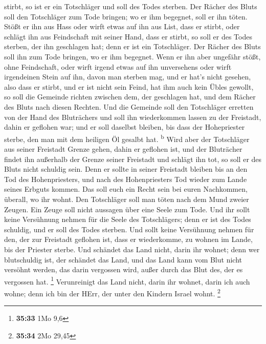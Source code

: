 stirbt, so ist er ein Totschläger und soll des Todes sterben.
 Der Rächer des Bluts soll den Totschläger zum Tode
bringen; wo er ihm begegnet, soll er ihn töten.  Stößt er
ihn aus Hass oder wirft etwas auf ihn aus List, dass er stirbt,
 oder schlägt ihn aus Feindschaft mit seiner Hand, dass
er stirbt, so soll er des Todes sterben, der ihn geschlagen hat; denn er
ist ein Totschläger. Der Rächer des Bluts soll ihn zum Tode bringen, wo
er ihm begegnet.  Wenn er ihn aber ungefähr stößt, ohne
Feindschaft, oder wirft irgend etwas auf ihn unversehens 
oder wirft irgendeinen Stein auf ihn, davon man sterben mag, und er
hat's nicht gesehen, also dass er stirbt, und er ist nicht sein Feind,
hat ihm auch kein Übles gewollt,  so soll die Gemeinde
richten zwischen dem, der geschlagen hat, und dem Rächer des Bluts nach
diesen Rechten.  Und die Gemeinde soll den Totschläger
erretten von der Hand des Bluträchers und soll ihn wiederkommen lassen
zu der Freistadt, dahin er geflohen war; und er soll daselbst bleiben,
bis dass der Hohepriester sterbe, den man mit dem heiligen Öl gesalbt
hat. \textsuperscript{b}  Wird aber der Totschläger aus
seiner Freistadt Grenze gehen, dahin er geflohen ist, 
und der Bluträcher findet ihn außerhalb der Grenze seiner Freistadt und
schlägt ihn tot, so soll er des Bluts nicht schuldig sein.
 Denn er sollte in seiner Freistadt bleiben bis an den
Tod des Hohenpriesters, und nach des Hohenpriesters Tod wieder zum Lande
seines Erbguts kommen.  Das soll euch ein Recht sein bei
euren Nachkommen, überall, wo ihr wohnt.  Den Totschläger
soll man töten nach dem Mund zweier Zeugen. Ein Zeuge soll nicht
aussagen über eine Seele zum Tode.  Und ihr sollt keine
Versühnung nehmen für die Seele des Totschlägers; denn er ist des Todes
schuldig, und er soll des Todes sterben.  Und sollt keine
Versühnung nehmen für den, der zur Freistadt geflohen ist, dass er
wiederkomme, zu wohnen im Lande, bis der Priester sterbe.
 Und schändet das Land nicht, darin ihr wohnet; denn wer
blutschuldig ist, der schändet das Land, und das Land kann vom Blut
nicht versöhnt werden, das darin vergossen wird, außer durch das Blut
des, der es vergossen hat. \footnote{\textbf{35:33} 1Mo 9,6}
 Verunreinigt das Land nicht, darin ihr wohnet, darin ich
auch wohne; denn ich bin der HErr, der unter den Kindern Israel wohnt.
\footnote{\textbf{35:34} 2Mo 29,45}

